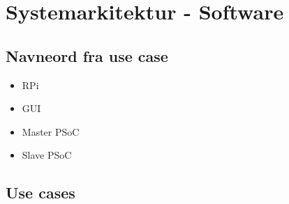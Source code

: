 \chapter{Systemarkitektur - Software}
\section{Navneord fra use case}

\begin{itemize}
    \item RPi
    \item GUI
    \item Master PSoC
    \item Slave PSoC
\end{itemize}

\section{Use cases}
